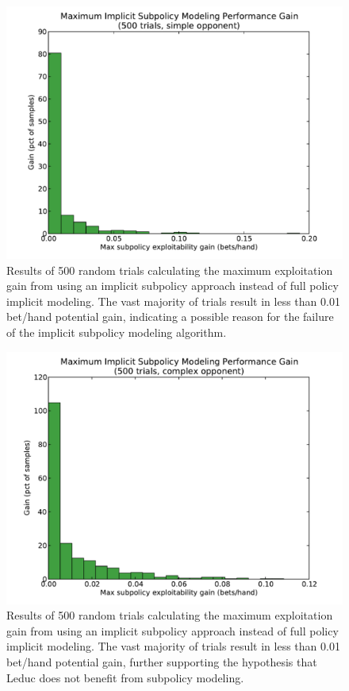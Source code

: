 \documentclass{aamas2013}
\begin{document}
\begin{figure}[thb]
  \centering
    \includegraphics[scale=.4]{subpolicygain_simple.pdf}
  \caption{Results of 500 random trials calculating the maximum exploitation gain from using an implicit subpolicy approach instead of full policy implicit modeling. The vast majority of trials result in less than 0.01 bet/hand potential gain, indicating a possible reason for the failure of the implicit subpolicy modeling algorithm.}
  \label{fig-subpolicygain-simple}
\end{figure}

\begin{figure}[thb]
  \centering
    \includegraphics[scale=.4]{subpolicygain_complex.pdf}
  \caption{Results of 500 random trials calculating the maximum exploitation gain from using an implicit subpolicy approach instead of full policy implicit modeling. The vast majority of trials result in less than 0.01 bet/hand potential gain, further supporting the hypothesis that Leduc does not benefit from subpolicy modeling.}
  \label{fig-subpolicygain-complex}
\end{figure}
\end{document}

